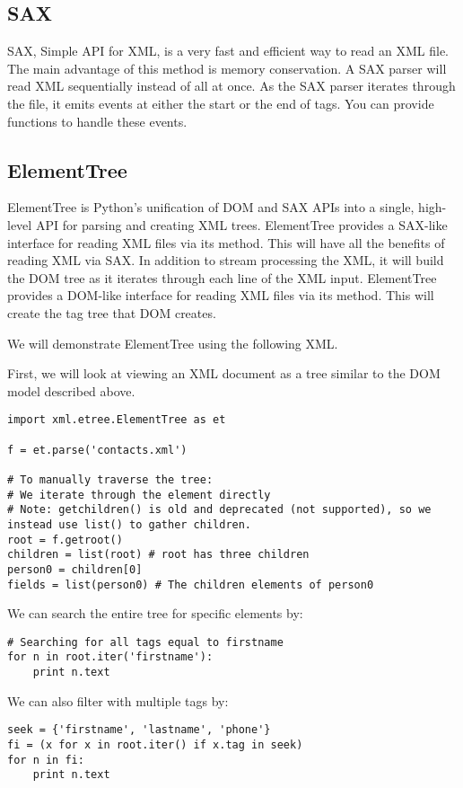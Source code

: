 \subsection*{SAX}
SAX, Simple API for XML, is a very fast and efficient way to read an XML file.
The main advantage of this method is memory conservation.
A SAX parser will read XML sequentially instead of all at once.
As the SAX parser iterates through the file, it emits events at either the start or the end of tags.
You can provide functions to handle these events.


\subsection*{ElementTree}
ElementTree is Python's unification of DOM and SAX APIs into a single, high-level API for parsing and creating XML trees.
ElementTree provides a SAX-like interface for reading XML files via its  method.
This will have all the benefits of reading XML via SAX.
In addition to stream processing the XML, it will build the DOM tree as it iterates through each line of the XML input.
ElementTree provides a DOM-like interface for reading XML files via its  method.
This will create the tag tree that DOM creates.

We will demonstrate ElementTree using the following XML.


First, we will look at viewing an XML document as a tree similar to the DOM model described above.
\begin{lstlisting}
import xml.etree.ElementTree as et

f = et.parse('contacts.xml')

# To manually traverse the tree:
# We iterate through the element directly
# Note: getchildren() is old and deprecated (not supported), so we instead use list() to gather children.
root = f.getroot()
children = list(root) # root has three children
person0 = children[0]
fields = list(person0) # The children elements of person0
\end{lstlisting}

We can search the entire tree for specific elements by:
\begin{lstlisting}
# Searching for all tags equal to firstname
for n in root.iter('firstname'):
    print n.text
\end{lstlisting}
    
We can also filter with multiple tags by:
\begin{lstlisting}
seek = {'firstname', 'lastname', 'phone'}
fi = (x for x in root.iter() if x.tag in seek)
for n in fi:
    print n.text
\end{lstlisting}
    
